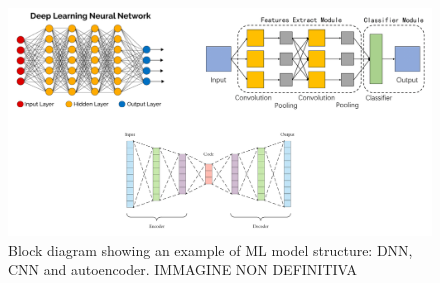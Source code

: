 \documentclass[12pt]{report}
\begin{document}
\begin{figure}[h!]
    \centering
    \includegraphics[width=140mm]{Figures/Chapter1/structures.png} 
    \caption{Block diagram showing an example of ML model structure: DNN, CNN and autoencoder. IMMAGINE NON DEFINITIVA}
    \label{fig:structures}    
\end{figure}  
\end{document}
